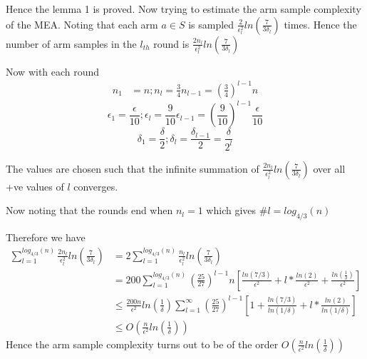 \documentclass[english]{article}
\begin{document}
Hence the lemma 1 is proved. Now trying to estimate the arm sample
complexity of the MEA. Noting that each arm $a\in S$ is sampled $\frac{2}{\epsilon_{l}^{2}}ln(\frac{7}{3\delta_{l}})$
times. Hence the number of arm samples in the $l_{th}$ round is $\frac{2n_{l}}{\epsilon_{l}^{2}}ln(\frac{7}{3\delta_{l}})$

Now with each round
\begin{align*}
n_{1} & =n;n_{l}=\frac{3}{4}n_{l-1}=(\frac{3}{4})^{l-1}n
\end{align*}
\[
\epsilon_{1}=\frac{\epsilon}{10};\epsilon_{l}=\frac{9}{10}\epsilon_{l-1}=(\frac{9}{10})^{l-1}\frac{\epsilon}{10}
\]
\[
\delta_{1}=\frac{\delta}{2};\delta_{l}=\frac{\delta_{l-1}}{2}=\frac{\delta}{2^{l}}
\]

The values are chosen such that the infinite summation of $\frac{2n_{l}}{\epsilon_{l}^{2}}ln(\frac{7}{3\delta_{l}})$
over all +ve values of $l$ converges.

Now noting that the rounds end when $n_{l}=1$ which gives $\#l=log_{4/3}(n)$

Therefore we have
\begin{align*}
\sum_{l=1}^{log_{4/3}(n)}\frac{2n_{l}}{\epsilon_{l}^{2}}ln(\frac{7}{3\delta_{l}}) & =2\sum_{l=1}^{log_{4/3}(n)}\frac{n_{l}}{\epsilon_{l}^{2}}ln(\frac{7}{3\delta_{l}})\\
 & =200\sum_{l=1}^{log_{4/3}(n)}(\frac{25}{27})^{l-1}n[\frac{ln(7/3)}{\epsilon^{2}}+l*\frac{ln(2)}{\epsilon^{2}}+\frac{ln(\frac{1}{\delta})}{\epsilon^{2}}]\\
 & \leq\frac{200n}{\epsilon^{2}}ln(\frac{1}{\delta})\sum_{l=1}^{\infty}(\frac{25}{27})^{l-1}[1+\frac{ln(7/3)}{ln(1/\delta)}+l*\frac{ln(2)}{ln(1/\delta)}]\\
 & \leq O(\frac{n}{\epsilon^{2}}ln(\frac{1}{\delta}))
\end{align*}
Hence the arm sample complexity turns out to be of the order $O(\frac{n}{\epsilon^{2}}ln(\frac{1}{\delta}))$
\end{document}
